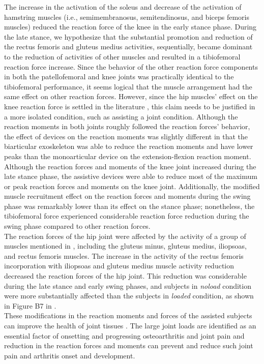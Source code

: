 \documentclass[10pt,letterpaper]{article}
\begin{document}
The increase in the activation of the soleus and decrease of the activation of hamstring muscles (i.e., semimembranosus, semitendinosus, and biceps femoris muscles) reduced the reaction force of the knee in the early stance phase. During the late stance, we hypothesize that the substantial promotion and reduction of the rectus femoris and gluteus medius activities, sequentially, became dominant to the reduction of activities of other muscles and resulted in a tibiofemoral reaction force increase. Since the behavior of the other reaction force components in both the patellofemoral and knee joints was practically identical to the tibiofemoral performance, it seems logical that the muscle arrangement had the same effect on other reaction forces. However, since the hip muscles' effect on the knee reaction force is settled in the literature \cite{170,171}, this claim needs to be justified in a more isolated condition, such as assisting a joint condition. Although the reaction moments in both joints roughly followed the reaction forces' behavior, the effect of devices on the reaction moments was slightly different in that the biarticular exoskeleton was able to reduce the reaction moments and have lower peaks than the monoarticular device on the extension-flexion reaction moment.\\
Although the reaction forces and moments of the knee joint increased during the late stance phase, the assistive devices were able to reduce most of the maximum or peak reaction forces and moments on the knee joint. Additionally, the modified muscle recruitment effect on the reaction forces and moments during the swing phase was remarkably lower than its effect on the stance phase; nonetheless, the tibiofemoral force experienced considerable reaction force reduction during the swing phase compared to other reaction forces.\\
The reaction forces of the hip joint were affected by the activity of a group of muscles mentioned in \cite{170}, including the gluteus minus, gluteus medius, iliopsoas, and rectus femoris muscles. The increase in the activity of the rectus femoris incorporation with iliopsoas and gluteus medius muscle activity reduction decreased the reaction forces of the hip joint. This reduction was considerable during the late stance and early swing phases, and subjects in {\it noload} condition were more substantially affected than the subjects in {\it loaded} condition, as shown in Figure B7 in . \\
These modifications in the reaction moments and forces of the assisted subjects can improve the health of joint tissues \cite{178}. The large joint loads are identified as an essential factor of onsetting and progressing osteoarthritis \cite{172,176,177} and joint pain \cite{175} and reduction in the reaction forces and moments can prevent and reduce such joint pain and arthritis onset and development.
\end{document}
